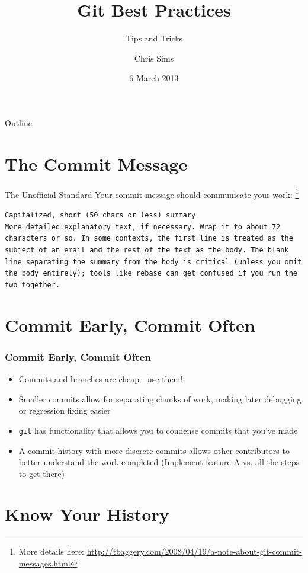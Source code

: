 \documentclass{beamer}
\title{Git Best Practices}
\subtitle{Tips and Tricks}
\author{Chris Sims}
\institute{Engineering and Computer Science Interest Group \\
           URI Student ACM Chapter}
\date{6 March 2013}
\begin{document}
\frame{\titlepage}

\begin{frame}{Outline}
  \tableofcontents
\end{frame}


\section{The Commit Message}
\begin{frame}{The Unofficial Standard}
  Your commit message should communicate your work:
  \footnote{More details here:
  \href{http://tbaggery.com/2008/04/19/a-note-about-git-commit-messages.html}
  {http://tbaggery.com/2008/04/19/a-note-about-git-commit-messages.html}}

  \texttt{Capitalized, short (50 chars or less) summary}\\
  \vfill
  \texttt{More detailed explanatory text, if necessary.  Wrap it to about 72
    characters or so.  In some contexts, the first line is treated as the
    subject of an email and the rest of the text as the body.  The blank
    line separating the summary from the body is critical (unless you omit
    the body entirely); tools like rebase can get confused if you run the
    two together.
  }

\end{frame}


\section{Commit Early, Commit Often}
\begin{frame}\frametitle{Commit Early, Commit Often}
\begin{itemize}
  \item Commits and branches are cheap - use them!
  \pause
  \item Smaller commits allow for separating chunks of work, making later
        debugging or regression fixing easier
  \pause
  \item \texttt{git} has functionality that allows you to condense commits that
        you've made
  \pause
  \item A commit history with more discrete commits allows other contributors to
        better understand the work completed (Implement feature A vs. all the
        steps to get there)
\end{itemize}

\end{frame}


\section{Know Your History}
\end{document}
